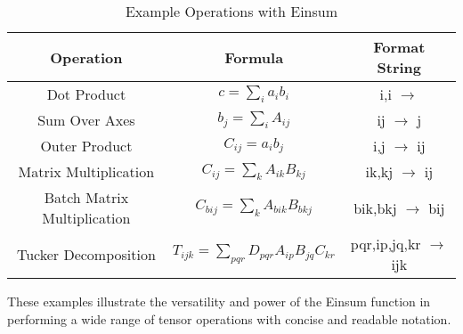 \begin{table}[h!]
    \centering
    \def\arraystretch{1.5}
    \begin{tabular}{ c  c  c }
        \hline
        \textbf{Operation}                 & \textbf{Formula}                                    & \textbf{Format String}         \\ \hline
        Dot Product                        & $c = \sum_{i} a_{i} b_{i}$                          & i,i $\rightarrow$              \\ \hline
        Sum Over Axes                      & $b_{j} = \sum_{i} A_{ij}$                           & ij $\rightarrow$ j             \\ \hline
        Outer Product                      & $C_{ij} = a_{i} b_{j}$                              & i,j $\rightarrow$ ij           \\ \hline
        Matrix Multiplication              & $C_{ij} = \sum_{k} A_{ik} B_{kj}$                   & ik,kj $\rightarrow$ ij         \\ \hline
        Batch Matrix Multiplication        & $C_{bij} = \sum_{k} A_{bik} B_{bkj}$                & bik,bkj $\rightarrow$ bij      \\ \hline
        Tucker Decomposition \cite{tucker} & $T_{ijk} = \sum_{pqr} D_{pqr} A_{ip} B_{jq} C_{kr}$ & pqr,ip,jq,kr $\rightarrow$ ijk \\ \hline
    \end{tabular}
    \caption{Example Operations with Einsum}
\end{table}

\noindent
These examples illustrate the versatility and power of the Einsum function
in performing a wide range of tensor operations with concise and readable notation.

